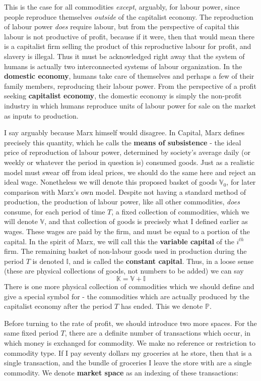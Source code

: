 \documentclass{article}
\theoremstyle{definition}
\theoremstyle{plain}
\theoremstyle{theorem}
\begin{document}
This is the case for all commodities \textit{except}, arguably, for labour power, since people reproduce themselves \textit{outside} of the capitalist economy. The reproduction of labour power \textit{does} require labour, but from the perspective of capital this labour is not productive of profit, because if it were, then that would mean there is a capitalist firm selling the product of this reproductive labour for profit, and slavery is illegal. Thus it must be acknowledged right away that the system of humans is actually two interconnected systems of labour organization. In the \textbf{domestic economy}, humans take care of themselves and perhaps a few of their family members, reproducing their labour power. From the perspective of a profit seeking \textbf{capitalist economy}, the domestic economy is simply the non-profit industry in which humans reproduce units of labour power for sale on the market as inputs to production.  \par 
I say arguably because Marx himself would disagree. In Capital, Marx defines precisely this quantity, which he calls the \textbf{means of subsistence} - the ideal price of reproduction of labour power, determined by society's average daily (or weekly or whatever the period in question is) consumed goods. Just as a realistic model must swear off from ideal prices, we should do the same here and reject an ideal wage. Nonetheless we will denote this proposed basket of goods $\mathbb{V}_0$, for later comparison with Marx's own model. 
Despite not having a standard method of production, the production of labour power, like all other commodities, \textit{does} consume, for each period of time $T$, a fixed collection of commodities, which we will denote $\mathbb{V}$, and that collection of goods is precisely what I defined earlier as wages. These wages are paid by the firm, and must be equal to a portion of the capital. In the spirit of Marx, we will call this the \textbf{variable capital} of the $i^{th}$ firm. The remaining basket of non-labour goods used in production during the period $T$ is denoted $\mathbb{I}$, and is called the \textbf{constant capital}. Thus, in a loose sense (these are physical collections of goods, not numbers to be added) we can say 
\[ \mathbb{K} = \mathbb{V}+\mathbb{I} \]
There is one more physical collection of commodities which we should define and give a special symbol for - the commodities which are actually produced by the capitalist economy after the period $T$ has ended. This we denote $\mathbb{P}$. \par 
Before turning to the rate of profit, we should introduce two more spaces. For the same fixed period $T$, there are a definite number of transactions which occur, in which money is exchanged for commodity. We make no reference or restriction to commodity type. If I pay seventy dollars my groceries at he store, then that is a single transaction, and the bundle of groceries I leave the store with are a single commodity. We denote \textbf{market space} as an indexing of these transactions:
\end{document}
